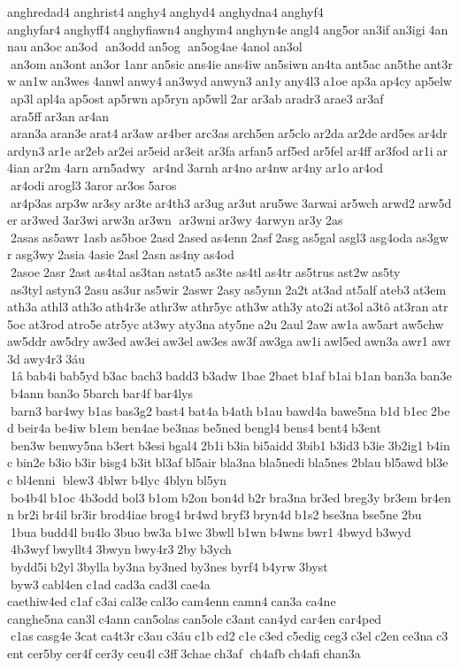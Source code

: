 anghredad4 	anghrist4 anghy4 anghyd4 	anghydna4 anghyf4 	anghyfar4 anghyff4 anghyfiawn4 anghym4 anghyn4e angl4 ang5or an3if an3igi 4annau an3oc an3od  an3odd an5og  an5og4ae 4anol an3ol  an3om an3ont an3or 1anr an5sic ans4ie ans4iw an5siwn an4ta ant5ac an5the ant3rw an1w an3wes 4anwl anwy4 an3wyd anwyn3 an1y any4l3 a1oe ap3a ap4cy ap5elw ap3l apl4a ap5ost ap5rwn ap5ryn ap5wll 2ar ar3ab aradr3 arae3 ar3af  ara5ff ar3an ar4an  aran3a aran3e arat4 ar3aw ar4ber arc3as arch5en ar5clo ar2da ar2de ard5es ar4dr ardyn3 ar1e ar2eb ar2ei ar5eid ar3eit ar3fa arfan5 arf5ed ar5fel ar4ff ar3fod ar1i ar4ian ar2m 4arn  	arn5adwy  ar4nd 3arnh ar4no ar4nw ar4ny ar1o ar4od  ar4odi arogl3 3aror ar3os 5aros  ar4p3as arp3w ar3sy ar3te ar4th3 ar3ug ar3ut aru5wc 3arwai ar5wch arwd2 arw5der ar3wed 3ar3wi arw3n ar3wn  ar3wni ar3wy 4arwyn ar3y 2as  2asas as5awr 1asb as5boe 2asd 2ased as4enn 2asf 2asg as5gal asgl3 asg4oda as3gwr asg3wy 2asia 4asie 2asl 2asn as4ny as4od  2asoe 2asr 2ast as4tal as3tan astat5 as3te as4tl as4tr as5trus ast2w as5ty  as3tyl astyn3 2asu as3ur as5wir 2aswr 2asy as5ynn 2a2t at3ad at5alf ateb3 at3em ath3a athl3 ath3o ath4r3e athr3w athr5yc ath3w ath3y ato2i at3ol a3tô at3ran atr5oc at3rod atro5e atr5yc at3wy aty3na aty5ne a2u 2aul 2aw aw1a aw5art aw5chw aw5ddr aw5dry aw3ed aw3ei aw3el aw3es aw3f aw3ga aw1i awl5ed awn3a awr1 awr3d awy4r3 3áu  1â bab4i bab5yd b3ac bach3 badd3 b3adw 1bae 2baet b1af b1ai b1an ban3a ban3e b4ann ban3o 5barch bar4f bar4lys  barn3 bar4wy b1as bas3g2 bast4 bat4a b4ath b1au bawd4a bawe5na b1d b1ec 2bed beir4a be4iw b1em ben4ae be3nas be5ned bengl4 bens4 bent4 b3ent  ben3w benwy5na b3ert b3esi bgal4 2b1i b3ia bi5aidd 3bib1 b3id3 b3ie 3b2ig1 b4inc bin2e b3io b3ir bisg4 b3it bl3af bl5air bla3na bla5nedi bla5nes 2blau bl5awd bl3ec bl4enni  blew3 4blwr b4lyc 4blyn bl5yn  bo4b4l b1oc 4b3odd bol3 b1om b2on bon4d b2r bra3na br3ed breg3y br3em br4enn br2i br4il br3ir brod4iae brog4 br4wd bryf3 bryn4d b1s2 bse3na bse5ne 2bu  1bua budd4l bu4lo 3buo bw3a b1wc 3bwll b1wn b4wns bwr1 4bwyd b3wyd  4b3wyf bwyllt4 3bwyn bwy4r3 2by b3ych  bydd5i b2yl 3bylla by3na by3ned by3nes byrf4 b4yrw 3byst  byw3 cabl4en c1ad cad3a cad3l cae4a 
caethiw4ed c1af c3ai cal3e cal3o cam4enn camn4 can3a ca4ne 	canghe5na can3l c4ann can5olas can5ole c3ant can4yd car4en car4ped  c1as casg4e 3cat ca4t3r c3au c3áu c1b cd2 c1e c3ed c5edig ceg3 c3el c2en ce3na c3ent cer5by cer4f cer3y ceu4l c3ff 3chae ch3af  ch4afb ch4afi chan3a 

